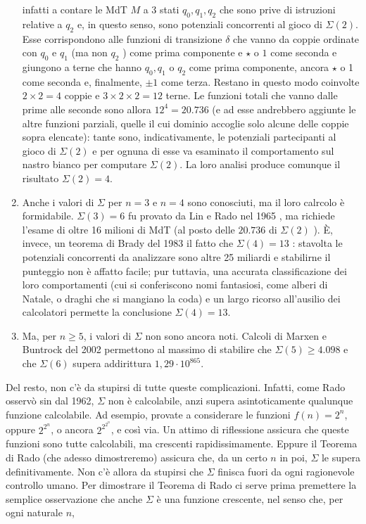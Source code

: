 \begin{enumerate}
          infatti a contare le MdT $M$ a 3 stati $q_0, q_1, q_2$ che sono prive di
          istruzioni relative a $q_2$ e, in questo senso, sono potenziali concorrenti
          al gioco di $\Sigma(2)$. Esse corrispondono alle funzioni di transizione
          $\delta$ che vanno da coppie ordinate con $q_0$ e $q_1$ (ma non $q_2$ )
          come prima componente e $\star$ o $1$ come seconda e giungono a terne che
          hanno $q_0, q_1$ o $q_2$ come prima componente, ancora $\star$ o 1 come
          seconda e, finalmente, $\pm 1$ come terza. Restano in questo modo coinvolte
          $2 \times 2=4$ coppie e $3 \times 2 \times 2=12$ terne. Le funzioni totali
          che vanno dalle prime alle seconde sono allora $12^4=20.736$ (e ad esse
          andrebbero aggiunte le altre funzioni parziali, quelle il cui dominio
          accoglie solo alcune delle coppie sopra elencate): tante sono,
          indicativamente, le potenziali partecipanti al gioco di $\Sigma(2)$ e per
          ognuna di esse va esaminato il comportamento sul nastro bianco per
          computare $\Sigma(2)$. La loro analisi produce comunque il risultato
          $\Sigma(2)=4$.
    \item Anche i valori di $\Sigma$ per $n = 3$ e $n = 4$ sono conosciuti, ma il loro calrcolo è formidabile.
          $\Sigma(3)=6$ fu provato da
          Lin e Rado nel 1965 , ma richiede l'esame di oltre 16 milioni di MdT (al
          posto delle $20.736$ di $\Sigma(2)$ ). È, invece, un teorema di Brady del
          1983 il fatto che $\Sigma(4)=13$ : stavolta le potenziali concorrenti da
          analizzare sono altre 25 miliardi e stabilirne il punteggio non è affatto
          facile; pur tuttavia, una accurata classificazione dei loro comportamenti
          (cui si conferiscono nomi fantasiosi, come alberi di Natale, o draghi che
          si mangiano la coda) e un largo ricorso all'ausilio dei calcolatori
          permette la conclusione $\Sigma(4)=13$.
    \item Ma, per $n \geq 5$, i valori di
          $\Sigma$ non sono ancora noti. Calcoli di Marxen e Buntrock del 2002
          permettono al massimo di stabilire che $\Sigma(5) \geq 4.098$ e che
          $\Sigma(6)$ supera addirittura $1,29 \cdot 10^{865}$.
\end{enumerate}

Del resto, non c'è da stupirsi di tutte queste complicazioni. Infatti, come
Rado osservò sin dal 1962, $\Sigma$ non è calcolabile, anzi supera
asintoticamente qualunque funzione calcolabile. Ad esempio, provate a
considerare le funzioni $f(n)=2^n$, oppure $2^{2^n}$, o ancora
$2^{2^{2^n}}$, e così via. Un attimo di riflessione assicura che queste
funzioni sono tutte calcolabili, ma crescenti rapidissimamente. Eppure il
Teorema di Rado (che adesso dimostreremo) assicura che, da un certo $n$ in
poi, $\Sigma$ le supera definitivamente. Non c'è allora da stupirsi che
$\Sigma$ finisca fuori da ogni ragionevole controllo umano. Per dimostrare
il Teorema di Rado ci serve prima premettere la semplice osservazione che
anche $\Sigma$ è una funzione crescente, nel senso che, per ogni naturale
$n$,

